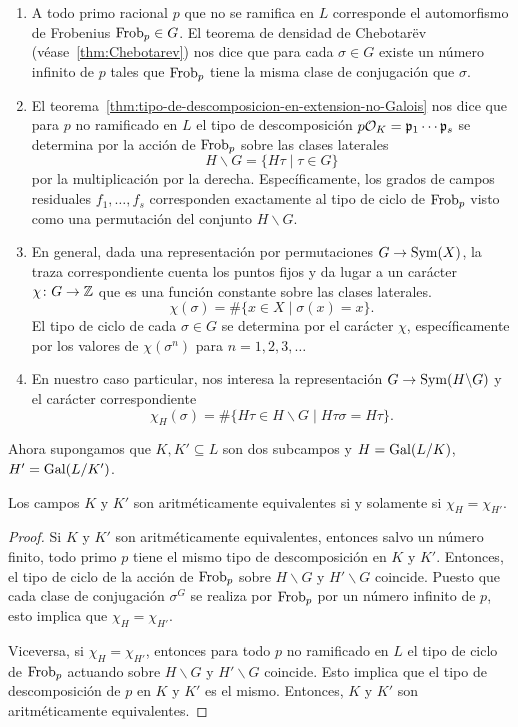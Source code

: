 \begin{enumerate}
\item A todo primo racional $p$ que no se ramifica en $L$ corresponde el
  automorfismo de Frobenius $\operatorname{Frob}_p \in G$. El teorema de densidad de
  Chebotarëv (véase~\ref{thm:Chebotarev}) nos dice que para cada $\sigma \in G$
  existe un número infinito de $p$ tales que $\operatorname{Frob}_p$ tiene la misma clase de
  conjugación que $\sigma$.

\item El teorema~\ref{thm:tipo-de-descomposicion-en-extension-no-Galois} nos
  dice que para $p$ no ramificado en $L$ el tipo de descomposición
  $p \mathcal{O}_K = \mathfrak{p}_1\cdots \mathfrak{p}_s$ se determina por la acción de
  $\operatorname{Frob}_p$ sobre las clases laterales
  $$H\backslash G = \{ H\tau \mid \tau \in G \}$$
  por la multiplicación por la derecha. Específicamente, los grados de campos
  residuales $f_1,\ldots,f_s$ corresponden exactamente al tipo de ciclo de
  $\operatorname{Frob}_p$ visto como una permutación del conjunto $H\backslash G$.

\item En general, dada una representación por permutaciones $G\to \operatorname{Sym} (X)$,
  la traza correspondiente cuenta los puntos fijos y da lugar a un carácter
  $\chi\colon G\to \mathbb{Z}$ que es una función constante sobre las clases laterales.
  $$\chi (\sigma) = \#\{ x \in X \mid \sigma (x) = x \}.$$
  El tipo de ciclo de cada $\sigma \in G$ se determina por el carácter $\chi$,
  específicamente por los valores de $\chi (\sigma^n)$ para $n = 1,2,3,\ldots$

\item En nuestro caso particular, nos interesa la representación
  $G \to \operatorname{Sym} (H \backslash G)$ y el carácter correspondiente
  $$\chi_H (\sigma) = \# \{ H\tau \in H\backslash G \mid H \tau \sigma = H \tau \}.$$
\end{enumerate}

Ahora supongamos que $K, K' \subseteq L$ son dos subcampos y $H = \operatorname{Gal} (L/K)$,
$H' = \operatorname{Gal} (L/K')$.

\begin{lema}
  Los campos $K$ y $K'$ son aritméticamente equivalentes si y solamente si
  $\chi_H = \chi_{H'}$.

  \begin{proof}
    Si $K$ y $K'$ son aritméticamente equivalentes, entonces salvo un número
    finito, todo primo $p$ tiene el mismo tipo de descomposición en $K$ y $K'$.
    Entonces, el tipo de ciclo de la acción de $\operatorname{Frob}_p$ sobre $H\backslash G$ y
    $H' \backslash G$ coincide. Puesto que cada clase de conjugación $\sigma^G$
    se realiza por $\operatorname{Frob}_p$ por un número infinito de $p$, esto implica que
    $\chi_H = \chi_{H'}$.

    Viceversa, si $\chi_H = \chi_{H'}$, entonces para todo $p$ no ramificado en
    $L$ el tipo de ciclo de $\operatorname{Frob}_p$ actuando sobre $H\backslash G$ y
    $H'\backslash G$ coincide. Esto implica que el tipo de descomposición de $p$
    en $K$ y $K'$ es el mismo. Entonces, $K$ y $K'$ son aritméticamente
    equivalentes.
  \end{proof}
\end{lema}

